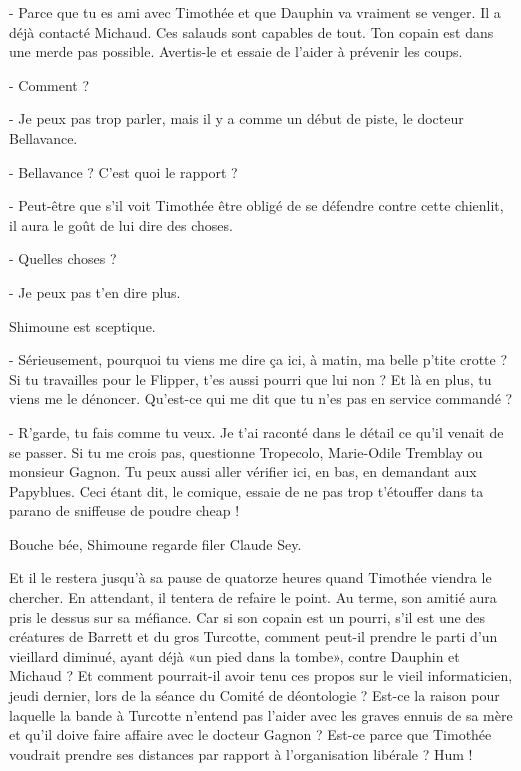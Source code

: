 - Parce que tu es ami avec Timothée et que Dauphin va vraiment se venger. Il a déjà contacté Michaud. Ces salauds sont capables de tout. Ton copain est dans une merde pas possible. Avertis-le et essaie de l’aider à prévenir les coups.

- Comment ?

- Je peux pas trop parler, mais il y a comme un début de piste, le docteur Bellavance.

- Bellavance ? C’est quoi le rapport ?

- Peut-être que s’il voit Timothée être obligé de se défendre contre cette chienlit, il aura le goût de lui dire des choses.

- Quelles choses ?

- Je peux pas t’en dire plus.

Shimoune est sceptique.

- Sérieusement, pourquoi tu viens me dire ça ici, à matin, ma belle p’tite crotte ? Si tu travailles pour le Flipper, t’es aussi pourri que lui non ? Et là en plus, tu viens me le dénoncer. Qu’est-ce qui me dit que tu n’es pas en service commandé ?

- R’garde, tu fais comme tu veux. Je t’ai raconté dans le détail ce qu’il venait de se passer. Si tu me crois pas, questionne Tropecolo, Marie-Odile Tremblay ou monsieur Gagnon. Tu peux aussi aller vérifier ici, en bas, en demandant aux Papyblues. Ceci étant dit, le comique, essaie de ne pas trop t’étouffer dans ta parano de sniffeuse de poudre cheap !

Bouche bée, Shimoune regarde filer Claude Sey.

Et il le restera jusqu’à sa pause de quatorze heures quand Timothée viendra le chercher. En attendant, il tentera de refaire le point. Au terme, son amitié aura pris le dessus sur sa méfiance. Car si son copain est un pourri, s’il est une des créatures de Barrett et du gros Turcotte, comment peut-il prendre le parti d’un vieillard diminué, ayant déjà «un pied dans la tombe», contre Dauphin et Michaud ? Et comment pourrait-il avoir tenu ces propos sur le vieil informaticien, jeudi dernier, lors de la séance du Comité de déontologie ? Est-ce la raison pour laquelle la bande à Turcotte n’entend pas l’aider avec les graves ennuis de sa mère et qu’il doive faire affaire avec le docteur Gagnon ? Est-ce parce que Timothée voudrait prendre ses distances par rapport à l’organisation libérale ? Hum !

